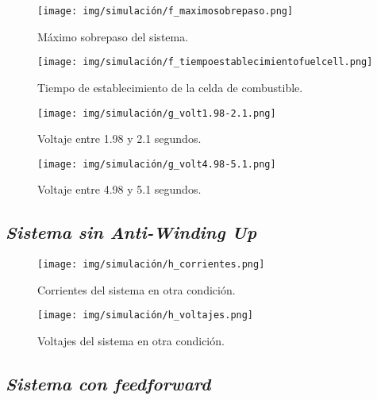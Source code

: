\begin{figure}[H]
    \centering
    \texttt{[image: img/simulación/f\_maximosobrepaso.png]}
    \caption{Máximo sobrepaso del sistema.}
\label{fig:f_maximosobrepaso}
\end{figure}

\begin{figure}[H]
    \centering
    \texttt{[image: img/simulación/f\_tiempoestablecimientofuelcell.png]}
    \caption{Tiempo de establecimiento de la celda de combustible.}
    \label{fig:f_tiempoestablecimientofuelcell}
\end{figure}



\begin{figure}[H]
    \centering
    \texttt{[image: img/simulación/g\_volt1.98-2.1.png]}
    \caption{Voltaje entre 1.98 y 2.1 segundos.}
    \label{fig:g_volt1.98-2.1}
\end{figure}

\begin{figure}[H]
    \centering
    \texttt{[image: img/simulación/g\_volt4.98-5.1.png]}
    \caption{Voltaje entre 4.98 y 5.1 segundos.}
    \label{fig:g_volt4.98-5.1}
\end{figure}

\subsection{\textit{Sistema sin Anti-Winding Up}}

\begin{figure}[H]
    \centering
    \texttt{[image: img/simulación/h\_corrientes.png]}
    \caption{Corrientes del sistema en otra condición.}
    \label{fig:h_corrientes}
\end{figure}

\begin{figure}[H]
    \centering
    \texttt{[image: img/simulación/h\_voltajes.png]}
    \caption{Voltajes del sistema en otra condición.}
    \label{fig:h_voltajes}
\end{figure}

\subsection{\textit{Sistema con feedforward}}

